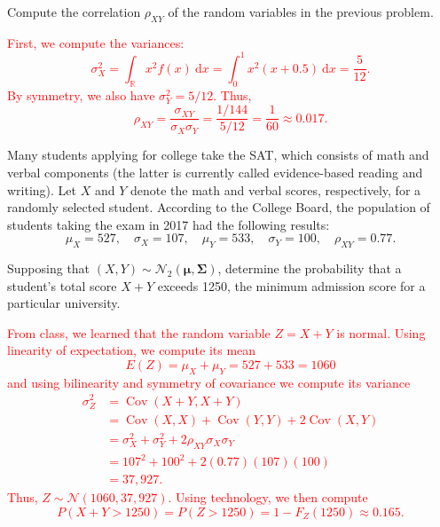 \documentclass[12pt,reqno]{amsart}
\begin{document}
\prob Compute the correlation $\rho_{XY}$ of the random variables in the previous problem.

\bigskip
\textcolor{red}{First, we compute the variances:
	\[\sigma_X^2 = \int_\mathbb{R} x^2 f(x) \ \text{d}x = \int_0^1 x^2(x+0.5) \ \text{d} x =  \frac{5}{12}.
	\]
By symmetry, we also have $\sigma_Y^2 = 5/12$. Thus,
	\[\rho_{XY} = \frac{\sigma_{XY}}{\sigma_X\sigma_Y} = \frac{1/144}{5/12} = \frac{1}{60} \approx 0.017.
	\]}
\bigskip









\prob Many students applying for college take the SAT, which consists of math and verbal components (the latter is currently called evidence-based reading and writing). Let $X$ and $Y$ denote the math and verbal scores, respectively, for a randomly selected student. According to the College Board, the population of students taking the exam in 2017 had the following results:
	\[\mu_X = 527, \quad \sigma_X = 107, \quad \mu_Y = 533, \quad \sigma_Y = 100, \quad \rho_{XY} = 0.77.
	\]

Supposing that $(X,Y) \sim \mathcal{N}_2(\boldsymbol\mu,\boldsymbol\Sigma)$, determine the probability that a student's total score $X+Y$ exceeds 1250, the minimum admission score for a particular university.

\bigskip
\textcolor{red}{From class, we learned that the random variable $Z =X+Y$ is normal. Using linearity of expectation, we compute its mean
	\[E(Z) = \mu_X + \mu_Y = 527 + 533 = 1060
	\]
and using bilinearity and symmetry of covariance we compute its variance
	\begin{align*}
	\sigma_Z^2 &= \operatorname{Cov}(X+Y,X+Y)  \\
	&= \operatorname{Cov}(X,X) + \operatorname{Cov}(Y,Y) + 2\operatorname{Cov}(X,Y) \\
	&= \sigma_X^2 + \sigma_Y^2 + 2 \rho_{XY} \sigma_{X}\sigma_Y \\
	&= 107 ^ 2 + 100 ^ 2 + 2(0.77)(107)(100) \\
	&= 37{,}927.
	\end{align*}
Thus, $Z \sim \mathcal{N}(1060, 37{,}927)$. Using technology, we then compute
	\[P(X+Y > 1250) = P(Z > 1250) = 1 - F_Z(1250) \approx 0.165.
	\]}
\end{document}

